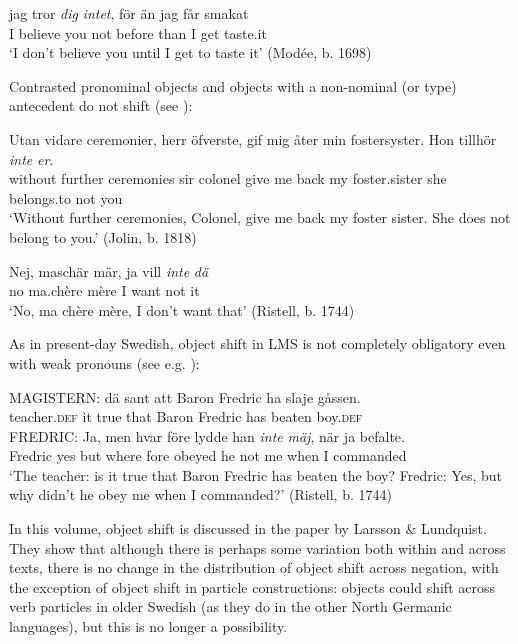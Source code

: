 \documentclass[output=paper]{langscibook}
\begin{document}
\ex\label{ex:intro:17b}
\gll  jag tror \textit{dig} \textit{intet},   för     än   jag   får smakat \\
    I     believe you     not     before   than   I     get taste.it\\
    \glt ‘I don’t believe you until I get to taste it’ (Modée, b. 1698)
\z
\z


Contrasted pronominal objects and objects with a non-nominal (or type) antecedent do not shift (see \citealt{Andreasson2008}):


\ea\label{ex:intro:18}
\ea\label{ex:intro:18a}
\gll  Utan     vidare ceremonier,   herr   öfverste,   gif   mig   åter min fostersyster. Hon   tillhör \textit{inte} \textit{er}.\\
without   further ceremonies   sir   colonel     give me   back my foster.sister she   belongs.to   not   you\\
\glt ‘Without further ceremonies, Colonel, give me back my foster sister. She does not belong to you.’ (Jolin, b. 1818)


\ex\label{ex:intro:18b}
\gll  Nej, maschär   mär,   ja vill \textit{inte} \textit{dä}\\
      no    ma.chère   mère  I  want  not   it\\
 \glt       ‘No, ma chère   mère, I don’t want that’ (Ristell, b. 1744)
\z
\z


As in present-day Swedish, object shift in LMS is not completely obligatory even with weak pronouns (see e.g. \citealt{Erteschik-ShirJosefsson2017}): 

\ea
\gll  MAGISTERN: dä     sant     att  Baron  Fredric  ha  slaje    gåssen. \\
  teacher\textsc{.def}  it  true   that  Baron  Fredric  has  beaten  boy.\textsc{def}\\

\gll  FREDRIC: Ja, men   hvar    före   lydde    han \textit{inte} \textit{mäj}, när      ja   befalte.\\
 Fredric    yes but   where  fore    obeyed   he    not  me   when    I   commanded\\
 
\glt ‘The teacher: is it true that Baron Fredric has beaten the boy? Fredric: Yes, but why didn’t he obey me when I commanded?’ (Ristell, b. 1744)
\z


In this volume, object shift is discussed in the paper by Larsson \& Lundquist. They show that although there is perhaps some variation both within and across texts, there is no change in the distribution of object shift across negation, with the exception of object shift in particle constructions: objects could shift across verb particles in older Swedish (as they do in the other North Germanic languages), but this is no longer a possibility.  
\end{document}
